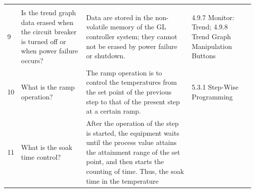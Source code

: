 \begin{longtable}[]{@{}|l|l|l|l|@{}}
\begin{minipage}[t]{0.33\columnwidth}
\end{minipage} & \begin{minipage}[t]{0.17\columnwidth}\raggedright
\strut
\end{minipage}\tabularnewline
 \begin{minipage}[t]{0.08\columnwidth}\raggedright
9\strut
\end{minipage} & \begin{minipage}[t]{0.30\columnwidth}\raggedright
Is the trend graph data erased when the circuit breaker is turned off or
when power failure occurs?\strut
\end{minipage} & \begin{minipage}[t]{0.33\columnwidth}\raggedright
Data are stored in the non-volatile memory of the GL controller system;
they cannot not be erased by power failure or shutdown.\strut
\end{minipage} & \begin{minipage}[t]{0.17\columnwidth}\raggedright
4.9.7 Monitor: Trend; 4.9.8 Trend Graph Manipulation Buttons\strut
\end{minipage}\tabularnewline
 \begin{minipage}[t]{0.08\columnwidth}\raggedright
10\strut
\end{minipage} & \begin{minipage}[t]{0.30\columnwidth}\raggedright
What is the ramp operation?\strut
\end{minipage} & \begin{minipage}[t]{0.33\columnwidth}\raggedright
The ramp operation is to control the temperatures from the set point of
the previous step to that of the present step at a certain ramp.\strut
\end{minipage} & \begin{minipage}[t]{0.17\columnwidth}\raggedright
5.3.1 Step-Wise Programming\strut
\end{minipage}\tabularnewline
 \begin{minipage}[t]{0.08\columnwidth}\raggedright
11\strut
\end{minipage} & \begin{minipage}[t]{0.30\columnwidth}\raggedright
What is the soak time control?\strut
\end{minipage} & \begin{minipage}[t]{0.33\columnwidth}\raggedright
After the operation of the step is started, the equipment waits until
the process value attains the attainment range of the set point, and
then starts the counting of time. Thus, the soak time in the temperature

\end{minipage}
\end{longtable}
